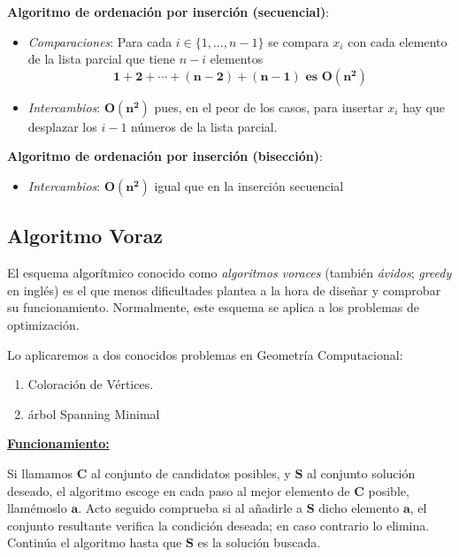 \documentclass[twoside]{report}
\newcommand{\bs}[1]{\boldsymbol{#1}}
\begin{document}
 \noindent\textbf{Algoritmo de ordenación por inserción (secuencial)}:
    \begin{itemize}
       \item \emph{Comparaciones}: Para cada $i\in \{1,\ldots, n-1\}$ se compara $x_i$ con cada elemento de la lista parcial que tiene $n-i$ elementos $$\bs{1+2+\cdots +(n-2)+(n-1) \mbox{ es } O(n^2)}$$

       \item \emph{Intercambios}: $\bs{O(n^2)}$ pues, en el peor de los casos, para insertar $x_i$ hay que desplazar los $i-1$ números de la lista parcial.
    \end{itemize}


 \noindent\textbf{Algoritmo de ordenación por inserción (bisección)}:
    \begin{itemize}
        \item \emph{Intercambios}: $\bs{O(n^2)}$ igual que en la inserción secuencial
    \end{itemize}


\subsection{Algoritmo Voraz}

El esquema algorítmico conocido como \emph{algoritmos voraces} (también \emph{ávidos}; \emph{greedy} en inglés) es el que menos dificultades plantea a la hora de diseñar y comprobar su funcionamiento. Normalmente, este esquema se aplica a los problemas de optimización.
\vspace{0.2cm}

Lo aplicaremos a dos conocidos problemas en Geometría Computacional:
        \begin{enumerate}
            \item Coloración de Vértices.
            \item árbol Spanning Minimal
        \end{enumerate}

\noindent\underline{\textbf{Funcionamiento:}}
\vspace{0.2cm}

Si llamamos $\bs{C}$ al conjunto de candidatos posibles, y $\bs{S}$ al conjunto solución deseado, el algoritmo escoge en cada paso al mejor
elemento de $\bs{C}$ posible, llamémoslo $\bs{a}$. Acto seguido comprueba si al añadirle a $\bs{S}$ dicho elemento $\bs{a}$, el conjunto
resultante verifica la condición deseada; en caso contrario lo elimina. Continúa el algoritmo hasta que $\bs{S}$ es la solución buscada.
\end{document}
